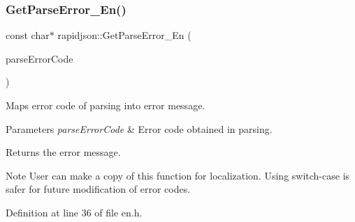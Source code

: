 \subsubsection{\texorpdfstring{GetParseError\_En()}{GetParseError\_En()}}
{\footnotesize\ttfamily const char$\ast$ rapidjson\+::\+Get\+Parse\+Error\+\_\+\+En (\begin{DoxyParamCaption}\item[{\mbox{\hyperlink{group___r_a_p_i_d_j_s_o_n___e_r_r_o_r_s_ga7d3acf640886b1f2552dc8c4cd6dea60}{Parse\+Error\+Code}}}]{parse\+Error\+Code }\end{DoxyParamCaption})}



Maps error code of parsing into error message. 


\begin{DoxyParams}{Parameters}
{\em parse\+Error\+Code} & Error code obtained in parsing. \\
\hline
\end{DoxyParams}
\begin{DoxyReturn}{Returns}
the error message. 
\end{DoxyReturn}
\begin{DoxyNote}{Note}
User can make a copy of this function for localization. Using switch-\/case is safer for future modification of error codes. 
\end{DoxyNote}


Definition at line 36 of file en.\+h.


